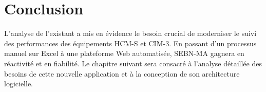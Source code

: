\section*{Conclusion}
L'analyse de l'existant a mis en évidence le besoin crucial de moderniser le suivi des performances des équipements HCM-S et CIM-3. En passant d'un processus manuel sur Excel à une plateforme Web automatisée, SEBN-MA gagnera en réactivité et en fiabilité. Le chapitre suivant sera consacré à l'analyse détaillée des besoins de cette nouvelle application et à la conception de son architecture logicielle.